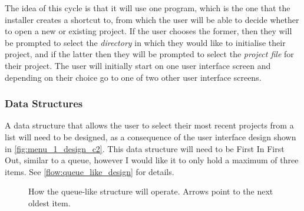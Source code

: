 \documentclass[11pt]{article}
\begin{document}
            The idea of this cycle is that it will use one program, which is the one that the installer creates a shortcut to, from which the user will be able to decide whether to open a new or existing project. If the user chooses the former, then they will be prompted to select the \textit{directory} in which they would like to initialise their project, and if the latter then they will be prompted to select the \textit{project file} for their project. 
            The user will initially start on one user interface screen and depending on their choice go to one of two other user interface screens.

            \subsubsection{Data Structures}
                
                A data structure that allows the user to select their most recent projects from a list will need to be designed, as a consequence of the user interface design shown in \autoref{fig:menu_1_design_c2}.
                This data structure will need to be First In First Out, similar to a queue, however I would like it to only hold a maximum of three items. 
                See \autoref{flow:queue_like_design} for details.

                \begin{figure}[!ht]
                    \centering
                    \caption{How the queue-like structure will operate. Arrows point to the next oldest item.}
                    \label{flow:queue_like_design}
                \end{figure}
                
\end{document}

